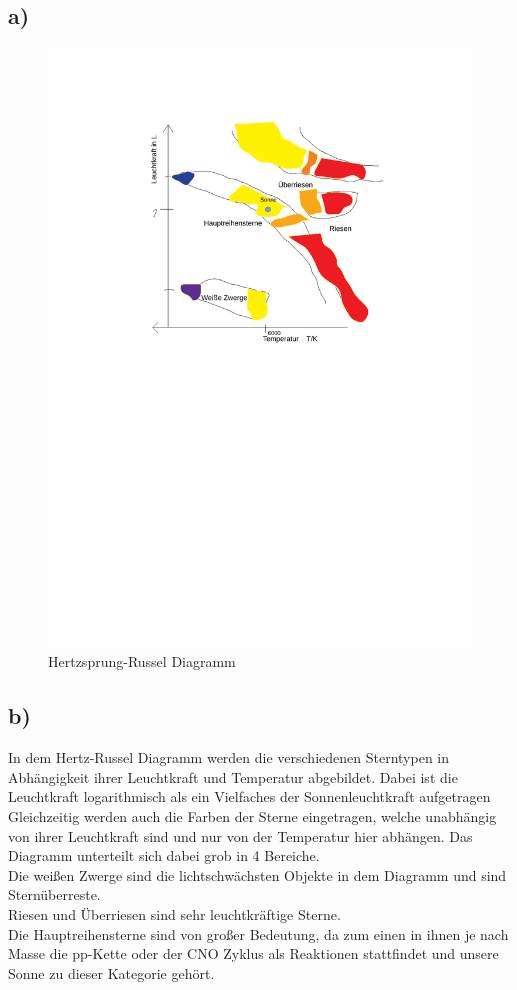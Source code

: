 \subsection{a)}
\begin{figure}[H]
    \centering
    \includegraphics[width=\linewidth]{images/hertz_russel.pdf}
    \caption{Hertzsprung-Russel Diagramm}
\end{figure}

\subsection{b)}
In dem Hertz-Russel Diagramm werden die verschiedenen Sterntypen
in Abhängigkeit ihrer Leuchtkraft und Temperatur abgebildet.
Dabei ist die Leuchtkraft logarithmisch als ein Vielfaches der
Sonnenleuchtkraft aufgetragen
Gleichzeitig werden auch die Farben der Sterne eingetragen, welche unabhängig
von ihrer Leuchtkraft sind und nur von der Temperatur hier abhängen.
Das Diagramm unterteilt sich dabei grob in 4 Bereiche.\\
Die weißen Zwerge sind die lichtschwächsten Objekte in dem Diagramm und sind Sternüberreste.\\
Riesen und Überriesen sind sehr leuchtkräftige Sterne.\\
Die Hauptreihensterne sind von großer Bedeutung, da zum einen in ihnen je nach Masse 
die pp-Kette oder der CNO Zyklus als Reaktionen stattfindet und unsere Sonne zu dieser Kategorie gehört.


